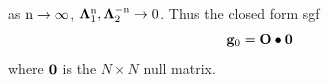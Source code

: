 \documentclass[a4paper, 12pt]{article}
\begin{document}
	as $\rm n\rightarrow\infty$, \quad $\bm\Lambda_1^{\rm n}, \bm\Lambda_2^{-\rm n}\rightarrow 0$. Thus the closed form \gls{sgf} 
\begin{equation}\label{SGF_AU}
	{\bf g}_0 = {\bf O} \bullet {\bf 0}
\end{equation}
where $\bf 0$ is the $N\times N$ null matrix.
\end{document}
